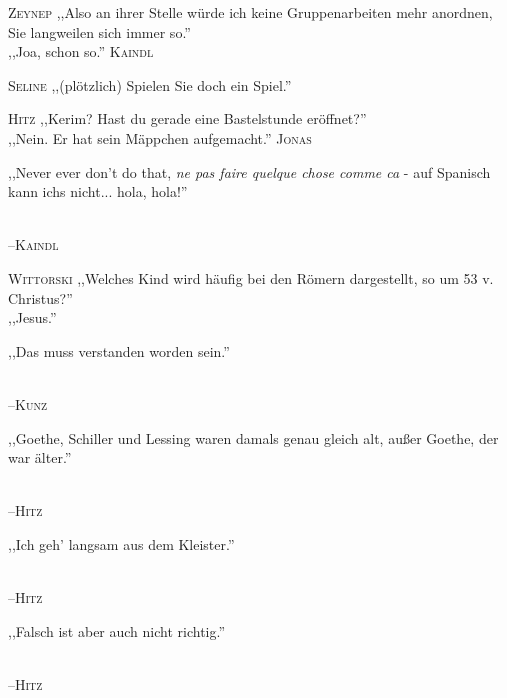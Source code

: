 \vspace{3mm}
\hangindent=0.7cm
\raggedright \textsc{\footnotesize Zeynep} ,,Also an ihrer Stelle würde ich keine Gruppenarbeiten mehr anordnen, Sie langweilen sich immer so.''\\
\raggedleft ,,Joa, schon so.'' \textsc{\footnotesize Kaindl}\\
\hangindent=0.7cm
\raggedright \textsc{\footnotesize Seline} ,,(plötzlich) Spielen Sie doch ein Spiel.''\\

\vspace{3mm}
\hangindent=0.7cm
\raggedright \textsc{\footnotesize Hitz} ,,Kerim? Hast du gerade eine Bastelstunde eröffnet?''\\
\raggedleft ,,Nein. Er hat sein Mäppchen aufgemacht.'' \textsc{\footnotesize Jonas}\\

\vspace{3mm}
{\raggedright ,,Never ever don’t do that, \emph{ne pas faire quelque chose comme ca} - auf Spanisch kann ichs nicht... hola, hola!''}\\
\raggedleft \textsc{\footnotesize --\/Kaindl}\\

\vspace{3mm}
\hangindent=0.7cm
\raggedright \textsc{\footnotesize Wittorski} ,,Welches Kind wird häufig bei den Römern dargestellt, so um 53 v. Christus?''\\
\raggedleft ,,Jesus.'' \textsc{\footnotesize  }\\

\vspace{3mm}
{\raggedright ,,Das muss verstanden worden sein.''}\\
\raggedleft \textsc{\footnotesize --\/Kunz}\\

\vspace{3mm}
{\raggedright ,,Goethe, Schiller und Lessing waren damals genau gleich alt, außer Goethe, der war älter.''}\\
\raggedleft \textsc{\footnotesize --\/Hitz}\\

\vspace{3mm}
{\raggedright ,,Ich geh' langsam aus dem Kleister.''}\\
\raggedleft \textsc{\footnotesize --\/Hitz}\\

\vspace{3mm}
{\raggedright ,,Falsch ist aber auch nicht richtig.''}\\
\raggedleft \textsc{\footnotesize --\/Hitz}\\

